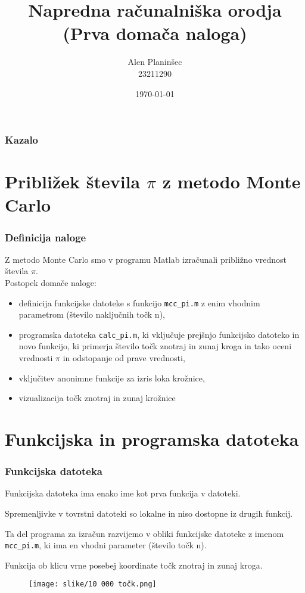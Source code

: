 \documentclass{beamer}
\title{Napredna računalniška orodja\\ (Prva domača naloga)}
\author{Alen Planinšec\\ 23211290}
\date{\today}
\begin{document}
\titlepage

\begin{frame}
\frametitle{Kazalo}
\tableofcontents
\end{frame}

\section{Približek števila $\pi$ z metodo Monte Carlo}
\begin{frame}
  \frametitle{Definicija naloge}
  Z metodo Monte Carlo smo v programu Matlab izračunali približno vrednost števila $\pi$.\\ Postopek domače naloge:
     \begin{itemize}
        \item definicija funkcijske datoteke s funkcijo \texttt{mcc\_pi.m} z enim vhodnim parametrom (število naključnih točk n),
        \pause
        \item programska datoteka \texttt{calc\_pi.m}, ki vključuje prejšnjo funkcijsko datoteko in novo funkcijo, ki primerja število točk znotraj in zunaj kroga in tako oceni vrednosti $\pi$ in odstopanje od prave vrednosti,
        \pause
        \item vključitev anonimne funkcije za izris loka krožnice,
        \pause
        \item vizualizacija točk znotraj in zunaj krožnice
  \end{itemize}
\end{frame}

\section{Funkcijska in programska datoteka}
\begin{frame}
    \frametitle{Funkcijska datoteka}
            \item Funkcijska datoteka ima enako ime kot prva funkcija v datoteki.
            \pause
            \item Spremenljivke v tovrstni datoteki so lokalne in niso dostopne iz drugih funkcij. 
            \pause
            \item Ta del programa za izračun razvijemo v obliki funkcijske datoteke z imenom \texttt{mcc\_pi.m}, ki ima en vhodni parameter (število točk n). 
            \pause
            \item Funkcija ob klicu vrne posebej koordinate točk znotraj in zunaj kroga.
 \begin{figure}
    \centering
    \texttt{[image: slike/10 000 točk.png]}
  \end{figure}
\end{frame}
\end{document}
